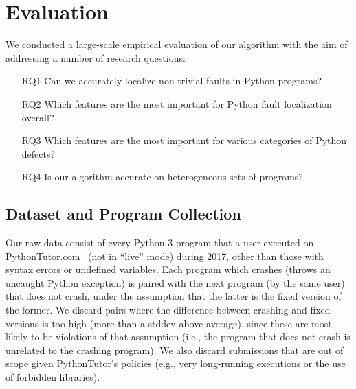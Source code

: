 \documentclass[conference]{IEEEtran}
\begin{document}


\section{Evaluation}
\label{sec-eval}

We conducted a large-scale empirical evaluation of our algorithm with the
aim of addressing a number of research questions:
\begin{enumerate}

\item[RQ1]{Can we accurately localize non-trivial faults in Python
programs?}

\item[RQ2]{Which features are the most important for Python fault
localization overall?}

\item[RQ3]{Which features are the most important for various categories of
Python defects?}

\item[RQ4]{Is our algorithm accurate on heterogeneous sets of programs?}

\end{enumerate}

\subsection{Dataset and Program Collection}

Our raw data consist of every Python 3 program that a user executed on
PythonTutor.com~\cite{Guo2013-vu} (not in ``live'' mode) during 2017, other
than those with syntax errors or undefined variables.  Each program which
crashes (throws an uncaught Python exception) is paired with the next
program (by the same user) that does not crash, under the assumption that
the latter is the fixed version of the former. We discard pairs where the
difference between crashing and fixed versions is too high (more than a
stddev above average), since these are most likely to be violations of that
assumption (i.e., the program that does not crash is unrelated to the
crashing program). We also discard submissions that are out of scope given
PythonTutor's policies (e.g., very long-running executions or the
use of forbidden libraries).
\end{document}
